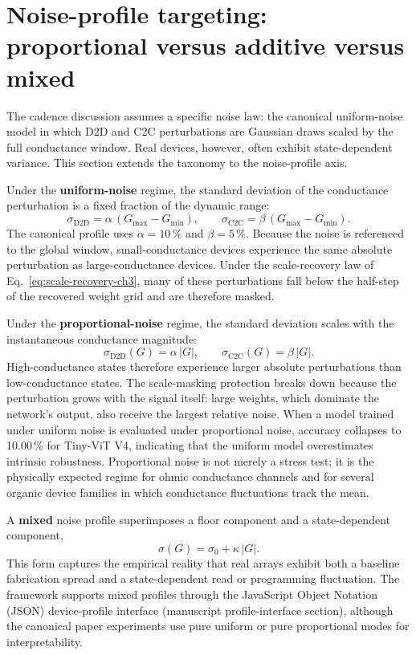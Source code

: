 \section{Noise-profile targeting: proportional versus additive versus mixed}
\label{sec:noise-profile-targeting}

The cadence discussion assumes a specific noise law: the canonical uniform-noise model in which D2D and C2C perturbations are Gaussian draws scaled by the full conductance window. Real devices, however, often exhibit state-dependent variance. This section extends the taxonomy to the noise-profile axis.

Under the \textbf{uniform-noise} regime, the standard deviation of the conductance perturbation is a fixed fraction of the dynamic range:
\begin{equation}
    \sigma_{\mathrm{D2D}} = \alpha\,(G_{\max}-G_{\min}), \qquad \sigma_{\mathrm{C2C}} = \beta\,(G_{\max}-G_{\min}).
\end{equation}
The canonical profile uses $\alpha=10\,\%$ and $\beta=5\,\%$. Because the noise is referenced to the global window, small-conductance devices experience the same absolute perturbation as large-conductance devices. Under the scale-recovery law of Eq.~\ref{eq:scale-recovery-ch3}, many of these perturbations fall below the half-step of the recovered weight grid and are therefore masked.

Under the \textbf{proportional-noise} regime, the standard deviation scales with the instantaneous conductance magnitude:
\begin{equation}
    \sigma_{\mathrm{D2D}}(G) = \alpha\,|G|, \qquad \sigma_{\mathrm{C2C}}(G) = \beta\,|G|.
\end{equation}
High-conductance states therefore experience larger absolute perturbations than low-conductance states. The scale-masking protection breaks down because the perturbation grows with the signal itself: large weights, which dominate the network's output, also receive the largest relative noise. When a model trained under uniform noise is evaluated under proportional noise, accuracy collapses to 10.00\,\% for Tiny-ViT V4, indicating that the uniform model overestimates intrinsic robustness.  Proportional noise is not merely a stress test; it is the physically expected regime for ohmic conductance channels and for several organic device families in which conductance fluctuations track the mean.

A \textbf{mixed} noise profile superimposes a floor component and a state-dependent component,
\begin{equation}
    \sigma(G) = \sigma_{0} + \kappa\,|G|.
\end{equation}
This form captures the empirical reality that real arrays exhibit both a baseline fabrication spread and a state-dependent read or programming fluctuation. The framework supports mixed profiles through the JavaScript Object Notation (JSON) device-profile interface (manuscript profile-interface section), although the canonical paper experiments use pure uniform or pure proportional modes for interpretability.

